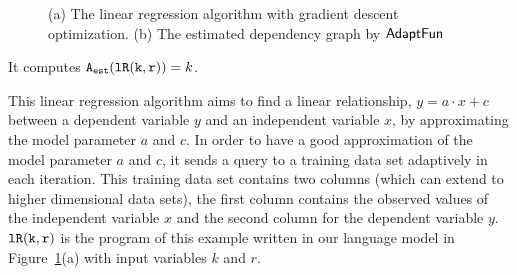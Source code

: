 \begin{example}
\begin{figure}
\begin{subfigure}{.55\textwidth}
\begin{centering}
     \caption{}
     \end{centering}
     \end{subfigure}
     \caption{(a) The linear regression algorithm with gradient descent optimization.
     (b) The estimated dependency graph by $\textsf{AdaptFun}$}
     \label{fig:linear_regression}
    \end{figure}
    It computes $ {\mathtt{A_{est}}}(\mathtt{lR(k, r)}) = k$.
    \end{example} 
    This linear regression algorithm 
    aims to
    find a linear relationship, $y = a \cdot x + c$ between a dependent variable $y$
    and an independent variable $x$, by approximating the 
    model parameter $a$ and $c$.
    In order to have a good approximation of the model parameter 
    $a$ and $c$, 
    it sends a query to a training data set adaptively in each iteration.
    This training data set contains two columns (which can extend to higher dimensional data sets), 
    the first column contains the observed values of the independent variable $x$ and the
    second column for the dependent variable $y$.
    $\mathtt{lR(k, r)}$ is the program of this example written in our language model in Figure~\ref{fig:linear_regression}(a)
    with input variables $k$ and $r$.
    
